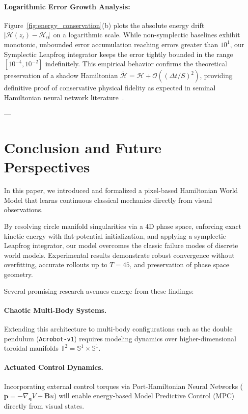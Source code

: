 \documentclass[11pt]{article}
\begin{document}
\paragraph{Logarithmic Error Growth Analysis:}
Figure~\ref{fig:energy_conservation}(b) plots the absolute energy drift $|\mathcal{H}(z_t) - \mathcal{H}_0|$ on a logarithmic scale. While non-symplectic baselines exhibit monotonic, unbounded error accumulation reaching errors greater than $10^1$, our Symplectic Leapfrog integrator keeps the error tightly bounded in the range $[10^{-4}, 10^{-2}]$ indefinitely. This empirical behavior confirms the theoretical preservation of a shadow Hamiltonian $\widetilde{\mathcal{H}} = \mathcal{H} + \mathcal{O}((\Delta t / S)^2)$, providing definitive proof of conservative physical fidelity as expected in seminal Hamiltonian neural network literature~\cite{greydanus2019hamiltonian,hairer2006geometric}.

---

\section{Conclusion and Future Perspectives}
\label{sec:conclusion}

In this paper, we introduced and formalized a pixel-based Hamiltonian World Model that learns continuous classical mechanics directly from visual observations.

By resolving circle manifold singularities via a 4D phase space, enforcing exact kinetic energy with flat-potential initialization, and applying a symplectic Leapfrog integrator, our model overcomes the classic failure modes of discrete world models. Experimental results demonstrate robust convergence without overfitting, accurate rollouts up to $T=45$, and preservation of phase space geometry.

Several promising research avenues emerge from these findings:

\paragraph{Chaotic Multi-Body Systems.} Extending this architecture to multi-body configurations such as the double pendulum (\texttt{Acrobot-v1}) requires modeling dynamics over higher-dimensional toroidal manifolds $\mathbb{T}^2 = \mathbb{S}^1 \times \mathbb{S}^1$.

\paragraph{Actuated Control Dynamics.} Incorporating external control torques via Port-Hamiltonian Neural Networks ($\dot{\mathbf{p}} = -\nabla_\mathbf{q} V + \mathbf{B} u$) will enable energy-based Model Predictive Control (MPC) directly from visual states.
\end{document}
